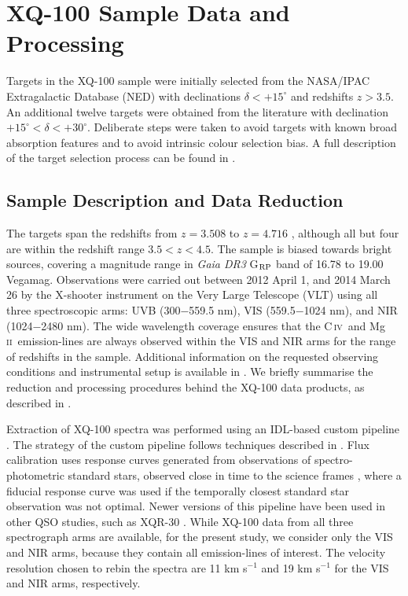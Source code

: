 \documentclass[fleqn,usenatbib]{mnras}
\newcommand{\mgii}{Mg\,\textsc{ii}}
\newcommand{\civ}{C\,\textsc{iv}}
\begin{document}
\section{XQ-100 Sample Data and Processing} \label{sec:sample}
Targets in the XQ-100 sample were initially selected from the NASA/IPAC Extragalactic Database (NED) with declinations $\delta < +15^{\circ}$ and redshifts $z > 3.5$. An additional twelve targets were obtained from the literature with declination $+15^{\circ} < \delta < +30^{\circ}$. Deliberate steps were taken to avoid targets with known broad absorption features and to avoid intrinsic colour selection bias. A full description of the target selection process can be found in \citet{Lopez_2016_XQ100}. 

\subsection{Sample Description and Data Reduction}
The targets span the redshifts from $z = 3.508$ to $z = 4.716$ \citep{Lopez_2016_XQ100}, although all but four are within the redshift range $3.5 < z < 4.5$. The sample is biased towards bright sources, covering a magnitude range in \textit{Gaia DR3} G$_{\rm{RP}}$ band \citep{GaiaEDR3_2021} of 16.78 to 19.00 Vegamag. Observations were carried out between 2012 April 1, and 2014 March 26 by the X-shooter instrument \citep{Vernet_2011_Xshooter} on the Very Large Telescope (VLT) using all three spectroscopic arms: UVB (300$-$559.5 nm), VIS (559.5$-$1024 nm), and NIR (1024$-$2480 nm). The wide wavelength coverage ensures that the \civ\ and \mgii\ emission-lines are always observed within the VIS and NIR arms for the range of redshifts in the sample. Additional information on the requested observing conditions and instrumental setup is available in \citet{Lopez_2016_XQ100}. We briefly summarise the reduction and processing procedures behind the XQ-100 data products, as described in \citet{Lopez_2016_XQ100}.

Extraction of XQ-100 spectra was performed using an IDL-based custom pipeline \citep{Becker_2012}. The strategy of the custom pipeline follows techniques described in \citet{Kelson_2003}. Flux calibration uses response curves generated from observations of spectro-photometric standard stars, observed close in time to the science frames \citep{Lopez_2016_XQ100}, where a fiducial response curve was used if the temporally closest standard star observation was not optimal. Newer versions of this pipeline have been used in other QSO studies, such as XQR-30 \citep{Dodorico_2023_XQR30}. While XQ-100 data from all three spectrograph arms are available, for the present study, we consider only the VIS and NIR arms, because they contain all emission-lines of interest. The velocity resolution chosen to rebin the spectra are 11 km s$^{-1}$ and 19 km s$^{-1}$ for the VIS and NIR arms, respectively.
\end{document}
